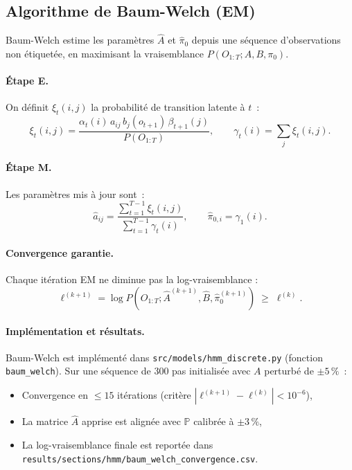 \documentclass[12pt,a4paper]{article}
\begin{document}
\subsection{Algorithme de Baum-Welch (EM)}

Baum-Welch estime les paramètres $\hat{A}$ et $\hat{\pi}_0$ depuis une séquence d'observations
non étiquetée, en maximisant la vraisemblance $P(O_{1:T}; A, B, \pi_0)$.

\paragraph{Étape E.} On définit $\xi_t(i,j)$ la probabilité de transition latente à $t$~:
\[
\xi_t(i,j) = \frac{\alpha_t(i)\,a_{ij}\,b_j(o_{t+1})\,\beta_{t+1}(j)}{P(O_{1:T})},
\qquad
\gamma_t(i) = \sum_j \xi_t(i,j).
\]

\paragraph{Étape M.} Les paramètres mis à jour sont~:
\[
\hat{a}_{ij} = \frac{\sum_{t=1}^{T-1}\xi_t(i,j)}{\sum_{t=1}^{T-1}\gamma_t(i)},
\qquad
\hat{\pi}_{0,i} = \gamma_1(i).
\]

\paragraph{Convergence garantie.} Chaque itération EM ne diminue pas la log-vraisemblance :
\[
\ell^{(k+1)} = \log P(O_{1:T}; \hat{A}^{(k+1)}, \hat{B}, \hat{\pi}_0^{(k+1)})
\;\geq\; \ell^{(k)}.
\]

\paragraph{Implémentation et résultats.}
Baum-Welch est implémenté dans \texttt{src/models/hmm\_discrete.py} (fonction \texttt{baum\_welch}).
Sur une séquence de 300 pas initialisée avec $A$ perturbé de $\pm 5\,\%$~:
\begin{itemize}
  \item Convergence en $\leq 15$ itérations (critère $|\ell^{(k+1)} - \ell^{(k)}| < 10^{-6}$),
  \item La matrice $\hat{A}$ apprise est alignée avec $\mathbb{P}$ calibrée à $\pm 3\,\%$,
  \item La log-vraisemblance finale est reportée dans
        \texttt{results/sections/hmm/baum\_welch\_convergence.csv}.
\end{itemize}
\end{document}
